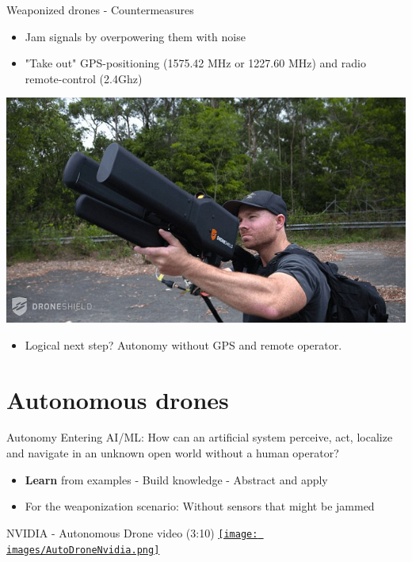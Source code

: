 \documentclass[aspectratio=169]{beamer}
\begin{document}
\begin{frame}{Weaponized drones - Countermeasures}
	\begin{itemize}
		\item Jam signals by overpowering them with noise
		\item "Take out" GPS-positioning (1575.42 MHz or 1227.60 MHz) and radio remote-control (2.4Ghz)
	\end{itemize}

\centering
\includegraphics[width=.5\textwidth]{images/drone_jammer.jpg}
	\begin{itemize}
		\item Logical next step? Autonomy without GPS and remote operator.
	\end{itemize}

\tiny{\color{gray}{http://www.dailymail.co.uk/sciencetech/article-3978762/The-death-ray-knock-drones-mile-away-Rifle-uses-radio-waves-kill-UAVs.html}}
\end{frame}

\section{Autonomous drones}
\begin{frame}{Autonomy}
	Entering AI/ML: How can an artificial system perceive, act, localize and navigate in an unknown open world without a human operator?
	\begin{itemize}
		\item \textbf{Learn} from examples - Build knowledge - Abstract and apply
		\item For the weaponization scenario: Without sensors that might be jammed
	\end{itemize}
\end{frame}

\begin{frame}{NVIDIA - Autonomous Drone video (3:10)}
        	\centering
            \href{run:./videos/AutoDroneNvidia.mp4?autostart}
            {\texttt{[image: images/AutoDroneNvidia.png]}}
\end{frame}
\end{document}
